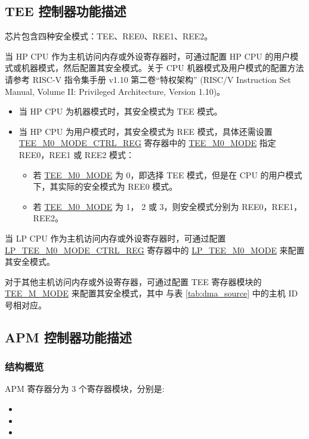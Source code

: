 \documentclass[main\_\_CN.tex]{subfiles}
\begin{document}
\subsection{TEE 控制器功能描述}

\chipname{} 芯片包含四种安全模式：TEE、REE0、REE1、REE2。

当 HP CPU 作为主机访问内存或外设寄存器时，可通过配置 HP CPU 的用户模式或机器模式，然后配置其安全模式。关于 CPU 机器模式及用户模式的配置方法请参考 RISC-V 指令集手册 v1.10 第二卷“特权架构” (RISC\-/V Instruction Set Manual, Volume II: Privileged Architecture, Version 1.10)。

\begin{itemize}
    \item 当 HP CPU 为机器模式时，其安全模式为 TEE 模式。
    \item 当 HP CPU 为用户模式时，其安全模式为 REE 模式，具体还需设置 \hyperref[regdesc:TEEM0MODECTRLREG]{TEE\_M0\_MODE\_CTRL\_REG} 寄存器中的 \hyperref[fielddesc:TEEM0MODE]{TEE\_M0\_MODE} 指定 REE0，REE1 或 REE2 模式：
    \begin{itemize}
        \item 若 \hyperref[fielddesc:TEEM0MODE]{TEE\_M0\_MODE} 为 0，即选择 TEE 模式，但是在 CPU 的用户模式下，其实际的安全模式为 REE0 模式。
        \item 若 \hyperref[fielddesc:TEEM0MODE]{TEE\_M0\_MODE} 为 1， 2 或 3，则安全模式分别为 REE0，REE1，REE2。
    \end{itemize}
\end{itemize}


当 LP CPU 作为主机访问内存或外设寄存器时，可通过配置 \hyperref[regdesc:LPTEEM0MODECTRLREG]{LP\_TEE\_M0\_MODE\_CTRL\_REG} 寄存器中的 \hyperref[fielddesc:LPTEEM0MODE]{LP\_TEE\_M0\_MODE} 来配置其安全模式。

对于其他主机访问内存或外设寄存器，可通过配置 TEE 寄存器模块的 \hyperref[fielddesc:TEEM0MODE]{TEE\_M\_MODE} 来配置其安全模式，其中  与表 \ref{tab:dma_source} 中的主机 ID 号相对应。



\subsection{APM 控制器功能描述}
\subsubsection{结构概览}
APM 寄存器分为 3 个寄存器模块，分别是:

\begin{itemize}
    \item {}
    \item {}
    \item {}
\end{itemize}
\end{document}
